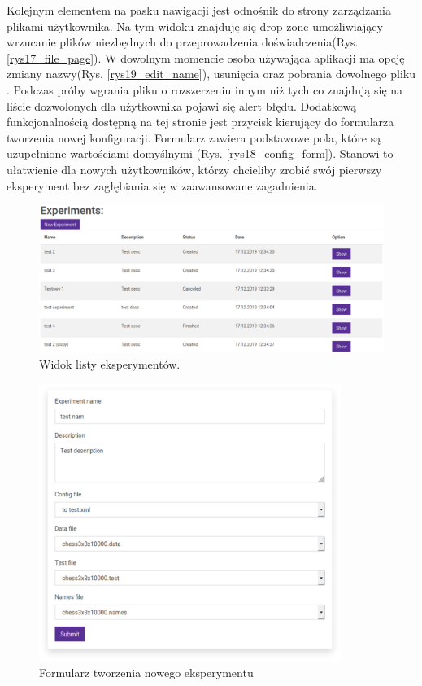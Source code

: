 Kolejnym elementem na pasku nawigacji jest odnośnik do strony zarządzania plikami użytkownika. Na tym widoku znajduję się drop zone umożliwiający wrzucanie plików niezbędnych do przeprowadzenia doświadczenia(Rys. \ref{rys17_file_page}). W dowolnym momencie osoba używająca aplikacji ma opcję zmiany nazwy(Rys. \ref{rys19_edit_name}), usunięcia oraz pobrania dowolnego pliku . Podczas próby wgrania pliku o rozszerzeniu innym niż tych co znajdują się na liście dozwolonych dla użytkownika pojawi się alert błędu. Dodatkową funkcjonalnością dostępną na tej stronie jest przycisk kierujący do formularza tworzenia nowej konfiguracji. Formularz zawiera podstawowe pola, które są uzupełnione wartościami domyślnymi (Rys. \ref{rys18_config_form}). Stanowi to ułatwienie dla nowych użytkowników, którzy chcieliby zrobić swój pierwszy eksperyment bez zagłębiania się w zaawansowane zagadnienia.
\begin{figure}[htb]
	\centering
	\includegraphics[width=15cm]{grafika/experiment_table.eps}
	\caption{Widok listy eksperymentów.}
	\label{rys10_experiment_table}
\end{figure}

\begin{figure}[htb]
	\centering
	\includegraphics[height=9cm]{grafika/experiment_form.eps}
	\caption{Formularz tworzenia nowego eksperymentu}
	\label{rys11_experiment_form}
\end{figure}



